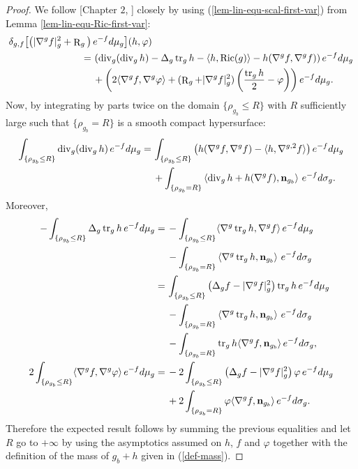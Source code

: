 \documentclass[a4paper,11pt,reqno]{amsart}
\def\Ric{\mathop{\rm Ric}\nolimits}
\def\tr{\mathop{\rm tr}\nolimits}
\def\div{\mathop{\rm div}\nolimits}
\def\Ric{\mathop{\rm Ric}\nolimits}
\def\tr{\mathop{\rm tr}\nolimits}
\def\div{\mathop{\rm div}\nolimits}
\def\R{\mathop{\rm R}\nolimits}
\numberwithin{equation}{section}
\begin{document}
	\begin{proof}
		We follow [Chapter $2$, \cite{Cho-Boo}] closely by using (\ref{lem-lin-equ-scal-first-var}) from Lemma \ref{lem-lin-equ-Ric-first-var}:
		\begin{equation*}
		\begin{split}
		\delta_{g,f}\big[\big(|\nabla^gf|^2_g+\R_g\big)\,&e^{-f}d\mu_g\big](h,\varphi)\\
		=\,&\left(\div_g(\div_gh)-\Delta_g\tr_gh-\langle h,\Ric(g)\rangle-h(\nabla^gf,\nabla^gf)\right) e^{-f}d\mu_g\\
		&+\left(2\langle \nabla^gf,\nabla^g\varphi\rangle+(\R_g+|\nabla^gf|^2_g)\left(\frac{\tr_gh}{2}-\varphi\right)\right)e^{-f}d\mu_g.
		\end{split}
		\end{equation*}
		Now, by integrating by parts twice on the domain $\{\rho_{g_b}\leq R\}$ with $R$ sufficiently large such that $\{\rho_{g_b}= R\}$ is a smooth compact hypersurface:
		\begin{equation*}
		\begin{split}
		\int_{\{\rho_{g_b}\leq R\}}\div_g(\div_gh)\,e^{-f}d\mu_g=\,&\int_{\{\rho_{g_b}\leq R\}}\left(h(\nabla^gf,\nabla^gf)-\langle h,\nabla^{g,2}f\rangle\right)e^{-f}d\mu_g\\
		&+\int_{\{\rho_{g_b}=R\}}\left<\div_gh+h(\nabla^gf),\mathbf{n}_{g_b}\right>\,e^{-f}d\sigma_g.
		\end{split}
		\end{equation*}
		Moreover,
		\begin{equation*}
		\begin{split}
		-\int_{\{\rho_{g_b}\leq R\}}\Delta_g\tr_gh\,e^{-f}d\mu_g=\,&-\int_{\{\rho_{g_b}\leq R\}}\langle\nabla^g\tr_gh,\nabla^gf\rangle \,e^{-f}d\mu_g\\
		&-\int_{\{\rho_{g_b}= R\}}\left<\nabla^g\tr_gh,\mathbf{n}_{g_b}\right>\,e^{-f}d\sigma_g\\
		=\,&\int_{\{\rho_{g_b}\leq R\}}\left(\Delta_gf-|\nabla^gf|^2_g\right)\tr_gh\,e^{-f}d\mu_g\\
		&-\int_{\{\rho_{g_b}= R\}}\left<\nabla^g\tr_gh,\mathbf{n}_{g_b}\right>\,e^{-f}d\sigma_g\\
		&-\int_{\{\rho_{g_b}=R\}}\tr_{g}h\langle\nabla^gf,\mathbf{n}_{g_b}\rangle\,e^{-f}d\sigma_g,\\
		2\int_{\{\rho_{g_b}\leq R\}}\langle \nabla^gf,\nabla^g\varphi\rangle\,e^{-f}d\mu_g=\,& -2\int_{\{\rho_{g_b}\leq R\}}\left(\Delta_gf-|\nabla^gf|^2_g\right)\varphi\,e^{-f}d\mu_g\\
		&+2\int_{\{\rho_{g_b}=R\}}\varphi\langle\nabla^gf,\mathbf{n}_{g_b}\rangle\,e^{-f}d\sigma_g.
		\end{split}
		\end{equation*}
		Therefore the expected result follows by summing the previous equalities and let $R$ go to $+\infty$ by using the asymptotics assumed on $h$, $f$ and $\varphi$ together with the definition of the mass of $g_b+h$ given in (\ref{def-mass}).
		

\end{proof}
\end{document}
